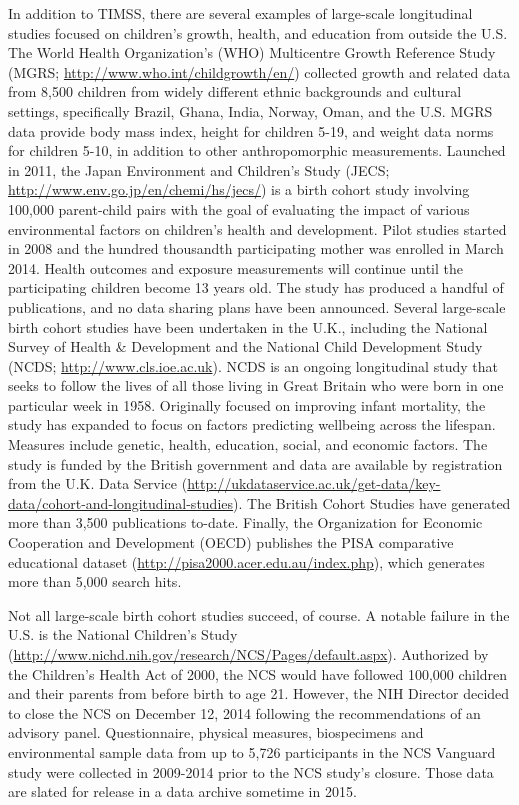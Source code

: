 \documentclass[letterpaper,man,apacite]{apa6}
\begin{document}
In addition to TIMSS, there are several examples of large-scale longitudinal studies focused on children's growth, health, and education from outside the U.S.
The World Health Organization's (WHO) Multicentre Growth Reference Study (MGRS; \url{http://www.who.int/childgrowth/en/}) collected growth and related data from 8,500 children from widely different ethnic backgrounds and cultural settings, specifically Brazil, Ghana, India, Norway, Oman, and the U.S.
MGRS data provide body mass index, height for children 5-19, and weight data norms for children 5-10, in addition to other anthropomorphic measurements.
Launched in 2011, the Japan Environment and Children's Study (JECS; \url{http://www.env.go.jp/en/chemi/hs/jecs/}) is a birth cohort study involving 100,000 parent-child pairs with the goal of evaluating the impact of various environmental factors on children's health and development. 
Pilot studies started in 2008 and the hundred thousandth participating mother was enrolled in March 2014. 
Health outcomes and exposure measurements will continue until the participating children become 13 years old.
The study has produced a handful of publications, and no data sharing plans have been announced.
Several large-scale birth cohort studies have been undertaken in the U.K., including the National Survey of Health \& Development and the National Child Development Study (NCDS; \url{http://www.cls.ioe.ac.uk}).
NCDS is an ongoing longitudinal study that seeks to follow the lives of all those living in Great Britain who were born in one particular week in 1958.
Originally focused on improving infant mortality, the study has expanded to focus on factors predicting wellbeing across the lifespan.
Measures include genetic, health, education, social, and economic factors.
The study is funded by the British government and data are available by registration from the U.K. Data Service (\url{http://ukdataservice.ac.uk/get-data/key-data/cohort-and-longitudinal-studies}).
The British Cohort Studies have generated more than 3,500 publications to-date.
Finally, the Organization for Economic Cooperation and Development (OECD) publishes the PISA comparative educational dataset (\url{http://pisa2000.acer.edu.au/index.php}), which generates more than 5,000 search hits.

Not all large-scale birth cohort studies succeed, of course.
A notable failure in the U.S. is the National Children's Study (\url{http://www.nichd.nih.gov/research/NCS/Pages/default.aspx}).
Authorized by the Children's Health Act of 2000, the NCS would have followed 100,000 children and their parents from before birth to age 21. 
However, the NIH Director decided to close the NCS on December 12, 2014 following the recommendations of an advisory panel. 
Questionnaire, physical measures, biospecimens and environmental sample data from up to 5,726 participants in the NCS Vanguard study were collected in 2009-2014 prior to the NCS study's closure.
Those data are slated for release in a data archive sometime in 2015.
\end{document}
